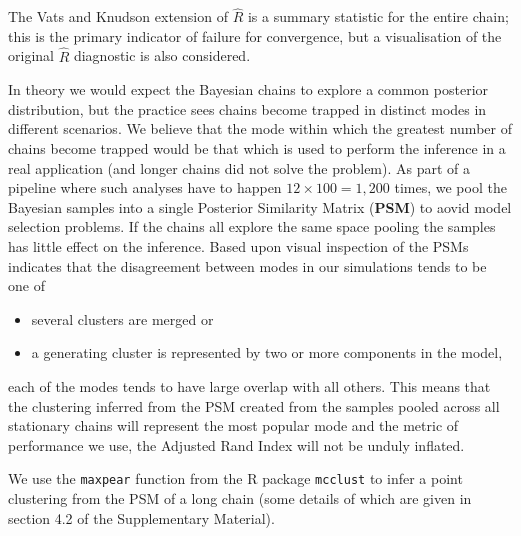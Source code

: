 \documentclass{bioinfo}
\begin{document}
The Vats and Knudson extension of $\hat{R}$ is a summary statistic for the entire chain; this is the primary indicator of failure for convergence, but a visualisation of the original $\hat{R}$ diagnostic is also considered. 

In theory we would expect the Bayesian chains to explore a common posterior distribution, but the practice sees chains become trapped in distinct modes in different scenarios. We believe that the mode within which the greatest number of chains become trapped would be that which is used to perform the inference in a real application (and longer chains did not solve the problem). As part of a pipeline where such analyses have to happen $12 \times 100 = 1,200$ times, we pool the Bayesian samples into a single Posterior Similarity Matrix (\textbf{PSM}) to aovid model selection problems. If the chains all explore the same space pooling the samples has little effect on the inference. Based upon visual inspection of the PSMs indicates that the disagreement between modes in our simulations tends to be one of 
\begin{itemize}
	\item several clusters are merged or
	\item a generating cluster is represented by two or more components in the model,
\end{itemize}
each of the modes tends to have large overlap with all others. This means that the clustering inferred from the PSM created from the samples pooled across all stationary chains will represent the most popular mode and the metric of performance we use, the Adjusted Rand Index \citep[\textbf{ARI},][]{hubert1985comparing} will not be unduly inflated.

We use the \texttt{maxpear} function \citep{fritsch2009improved} from the R package \texttt{mcclust} \citep{fritsch2012mcclust} to infer a point clustering from the PSM of a long chain (some details of which are given in section 4.2 of the Supplementary Material). %

\end{document}
